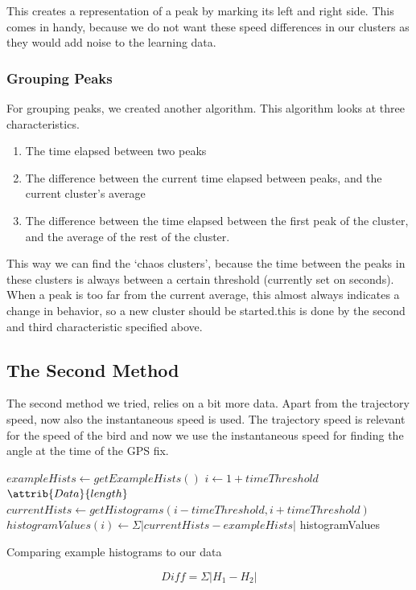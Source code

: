  This creates a representation of a peak by marking its left and right side.
 This comes in handy, because we do not want these speed differences in our
 clusters as they would add noise to the learning data.

 \subsubsection{Grouping Peaks}
 For grouping peaks, we created another algorithm. This algorithm looks at three
 characteristics.  
 \begin{enumerate}
 \item The time elapsed between two peaks
 \item The difference between the current time elapsed between peaks, and the
 current cluster's average
 \item The difference between the time elapsed between the first peak of the
 cluster, and the average of the rest of the cluster.
 \end{enumerate}
 This way we can find the `chaos clusters', because the time between the peaks
 in these clusters is always between a certain threshold (currently set on
 \timeThreshold seconds). 
 When a peak is too far from the  current average, this almost always indicates
 a change in behavior, so a new cluster should be started.this is done by the
 second and third characteristic specified above.

\subsection{The Second Method}
The second method we tried, relies on a bit more data. Apart from the trajectory
speed, now also the instantaneous speed is used. The trajectory speed is relevant for
the speed of the bird and now we use the instantaneous speed for finding the angle
at the time of the GPS fix. 

\begin{algorithm}
\begin{codebox}
\li $exampleHists \gets getExampleHists()$
\li \For $i \gets 1 + timeThreshold$ \To $\attrib{Data}{length}$ 
\li \Do
    $currentHists \gets getHistograms(i-timeThreshold, i+timeThreshold)$
    \li $histogramValues(i) \gets \Sigma \left| currentHists - exampleHists \right|$
\End
\li \Return histogramValues
\end{codebox}
\caption{Comparing example histograms to our data}
\label{alg:hist}
\end{algorithm}
\begin{equation}
 \label{eq:hist}
 Diff = \Sigma \left| H_1 - H_2 \right|
\end{equation}

